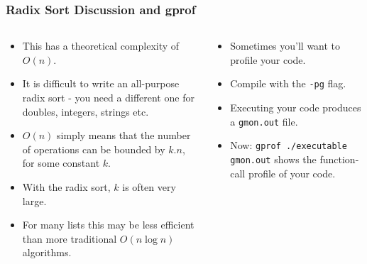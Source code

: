 \begin{frame}[fragile]
\frametitle{Radix Sort Discussion and gprof}

\begin{columns}[T]

\begin{column}{0.45\textwidth}
\begin{itemize}[<+->]
\item This has a theoretical complexity of $O(n)$.
\item It is difficult to write an all-purpose radix sort - you need a different one for doubles, integers, strings etc.
\item $O(n)$ simply means that the number of operations can be bounded by $k.n$, for some constant $k$.
\item With the radix sort, $k$ is often very large.
\item For many lists this may be less efficient than more traditional $O(n \log n)$ algorithms.
\end{itemize}
\end{column}

\begin{column}{0.45\textwidth}
\begin{itemize}[<+->]
\item Sometimes you'll want to profile your code.
\item Compile with the \verb^-pg^ flag.
\item Executing your code produces a \verb^gmon.out^ file.
\item Now: \verb^gprof ./executable gmon.out^ shows the function-call profile of your code.
\end{itemize}
\end{column}

\end{columns}
\end{frame}
